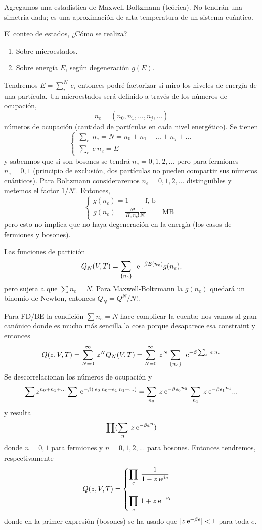 \documentclass[10pt,oneside]{CBFT_book}
\begin{document}
Agregamos una estadística de Maxwell-Boltzmann (teórica). No tendrán una simetría dada; es una aproximación
de alta temperatura de un sistema cuántico.

El conteo de estados, ¿Cómo se realiza?
\begin{enumerate}
 \item Sobre microestados.
 \item Sobre energía $E$, según degeneración $g(E)$.
\end{enumerate}

Tendremos $ E = \sum_i^N \: e_i $ entonces podré factorizar si miro los niveles de energía de una partícula.
Un microestados será definido a través de los números de ocupación,
\[
	n_e = ( n_0, n_1, ..., n_j, ... )
\]
números de ocupación (cantidad de partículas en cada nivel energético). Se tienen 
\[
	\begin{cases}
		\sum_e \: n_e = N = n_0 + n_1 + ... + n_j + ... \\
		\sum_e \: e \: n_e = E
	\end{cases}
\]
y sabemnos que si son bosones se tendrá $n_e=0,1,2,...$ pero para fermiones $n_e=0,1$ (principio de exclusión,
dos partículas no pueden compartir sus números cuánticos). Para Boltzmann consideraremos $ n_e = 0, 1, 2, ...$
distinguibles y metemos el factor $ 1 / N! $. Entonces,
\[
	\begin{cases}
		g(n_e) = 1 \qquad \text{ f, b } \\
		g(n_e) = \frac{ N! }{ \Pi_e \: n_e! } \frac{ 1 }{ N! } \qquad \text{ MB }
	\end{cases} 
\]
pero esto no implica que no haya degeneración en la energía (los casos de fermiones y bosones).

Las funciones de partición 
\[
	Q_N(V,T) = \sum_{ \{n_e\} } \: \:\mathrm{e}^{ -\beta E(n_e) } g(n_e),
\]
pero sujeta a que $ \sum n_e = N $. Para Maxwell-Boltzmann la $ g(n_e) $ quedará un binomio de Newton,
entonces $ Q_N = Q^N / N! $.

Para FD/BE la condición $ \sum n_e = N $ hace complicar la cuenta; nos vamos al gran canónico donde
es mucho más sencilla la cosa porque desaparece esa constraint y entonces
\[
	Q(z,V,T) = \sum_{N=0}^\infty \: z^N Q_N(V,T) =
	\sum_{N=0}^\infty \: z^N \sum_{ \{n_e\} } \: \:\mathrm{e}^{ -\beta \sum_e \: e \: n_e }
\]
Se descorrelacionan los números de ocupación y 
\[
	\sum z^{n_0 + n_1 + ...} \sum \:\mathrm{e}^{ -\beta ( \: e_0 \: n_0 + e_1 \: n_1 + ... ) } =
	\sum_{n_0} \: z {\:\mathrm{e}^{-\beta e_0}}^{n_0} \: \sum_{n_1} \: z {\:\mathrm{e}^{-\beta e_1}}^{n_1} ...
\]
y resulta
\[
	\prod ( \sum_{n} \: z {\:\mathrm{e}^{-\beta e}}^{n} )
\]
donde $ n=0,1$ para fermiones y $n=0,1,2,...$ para bosones.
Entonces tendremos, respectivamente
\[
	Q(z,V,T) = \begin{cases}
		\displaystyle \prod_e \: \frac{1}{1-z\:\mathrm{e}^{\beta e}} \\
		\\
		\displaystyle \prod_e \:  1 + z\:\mathrm{e}^{-\beta e}
	\end{cases}
\]
donde en la primer expresión (bosones) se ha usado que $ | z \:\mathrm{e}^{-\beta e} | < 1 $ para toda $e$.
\end{document}
